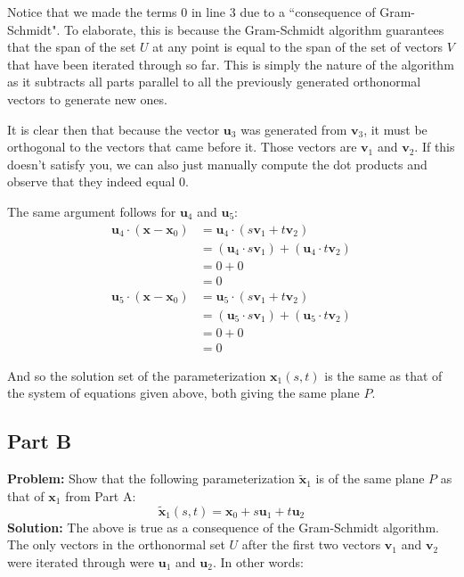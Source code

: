 \documentclass{article}
\begin{document}
Notice that we made the terms 0 in line 3 due to a ``consequence of Gram-Schmidt". To elaborate, this is because the Gram-Schmidt algorithm guarantees that the span of the set $U$ at any point is equal to the span of the set of vectors $V$ that have been iterated through so far. This is simply the nature of the algorithm as it subtracts all parts parallel to all the previously generated orthonormal vectors to generate new ones.

It is clear then that because the vector $\mathbf u_3$ was generated from $\mathbf v_3$, it must be orthogonal to the vectors that came before it. Those vectors are $\mathbf v_1$ and $\mathbf v_2$. If this doesn't satisfy you, we can also just manually compute the dot products and observe that they indeed equal 0.

The same argument follows for $\mathbf u_4$ and $\mathbf u_5$:
\begin{align*}
  \mathbf u_4\cdot(\mathbf x-\mathbf x_0)&=\mathbf u_4\cdot(s\mathbf v_1+t\mathbf v_2)\\
  &=(\mathbf u_4\cdot s\mathbf v_1)+(\mathbf u_4\cdot t\mathbf v_2)\tag{distr. of dot prod.}\\
  &=0+0\tag{consequence of Gram-Schmidt}\\
  &=0
\end{align*}
\begin{align*}
  \mathbf u_5\cdot(\mathbf x-\mathbf x_0)&=\mathbf u_5\cdot(s\mathbf v_1+t\mathbf v_2)\\
  &=(\mathbf u_5\cdot s\mathbf v_1)+(\mathbf u_5\cdot t\mathbf v_2)\tag{distr. of dot prod.}\\
  &=0+0\tag{consequence of Gram-Schmidt}\\
  &=0
\end{align*}

And so the solution set of the parameterization $\mathbf x_1(s,t)$  is the same as that of the system of equations given above, both giving the same plane $P$.

\subsection*{Part B}
\textbf{Problem:} Show that the following parameterization $\tilde{\mathbf x}_1$ is of the same plane $P$ as that of $\mathbf x_1$ from Part A:
$$\tilde{\mathbf x}_1(s,t)=\mathbf x_0+s\mathbf u_1+t\mathbf u_2$$
\textbf{Solution:} The above is true as a consequence of the Gram-Schmidt algorithm. The only vectors in the orthonormal set $U$ after the first two vectors $\mathbf v_1$ and $\mathbf v_2$ were iterated through were $\mathbf u_1$ and $\mathbf u_2$. In other words:
\end{document}
